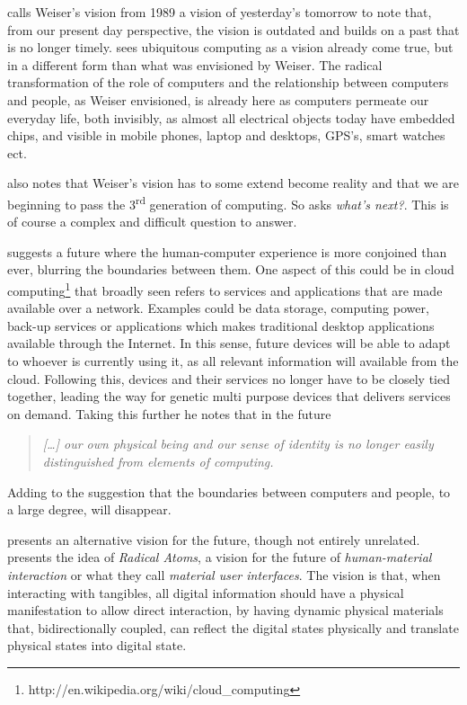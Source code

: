 \citet{bell2007yesterday} calls Weiser's vision from 1989 a vision of yesterday's tomorrow to note that, from our present day perspective, the vision is outdated and builds on a past that is no longer timely.
\citeauthor{bell2007yesterday} sees ubiquitous computing as a vision already come true, but in a different form than what was envisioned by Weiser.
The radical transformation of the role of computers and the relationship between computers and people, as Weiser envisioned, is already here as computers permeate our everyday life, both invisibly, as almost all electrical objects today have embedded chips, and visible in mobile phones, laptop and desktops, GPS's, smart watches ect.

\citet{abowd2012next} also notes that Weiser's vision has to some extend become reality and that we are beginning to pass the 3\textsuperscript{rd} generation of computing.
So \citeauthor{abowd2012next} asks \textit{what's next?}.
This is of course a complex and difficult question to answer.

\citeauthor{abowd2012next} suggests a future where the human-computer experience is more conjoined than ever, blurring the boundaries between them.
One aspect of this could be in cloud computing\footnote{http://en.wikipedia.org/wiki/cloud\_computing} that broadly seen refers to services and applications that are made available over a network.
Examples could be data storage, computing power, back-up services or applications which makes traditional desktop applications available through the Internet.
In this sense, future devices will be able to adapt to whoever is currently using it, as all relevant information will available from the cloud.
Following this, devices and their services no longer have to be closely tied together, leading the way for genetic multi purpose devices that delivers services on demand.
Taking this further he notes that in the future
\begin{quote}
\emph{[\ldots] our own physical being and our sense of identity is no longer easily distinguished from elements of computing.}
\end{quote}
Adding to the suggestion that the boundaries between computers and people, to a large degree, will disappear.

\citet{ishii2012radical} presents an alternative vision for the future, though not entirely unrelated.
\citeauthor{ishii2012radical} presents the idea of \textit{Radical Atoms}, a vision for the future of \textit{human-material interaction} or what they call \textit{material user interfaces}.
The vision is that, when interacting with tangibles, all digital information should have a physical manifestation to allow direct interaction, by having dynamic physical materials that, bidirectionally coupled, can reflect the digital states physically and translate physical states into digital state.

